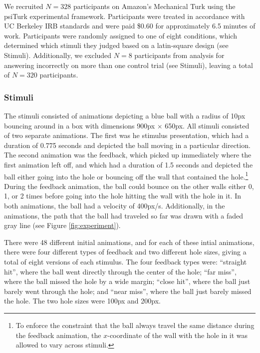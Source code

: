 \documentclass[11pt]{article}
\begin{document}
We recruited $N=328$ participants on Amazon's Mechanical Turk using the psiTurk \cite{McDonnell12} experimental framework. Participants were treated in accordance with UC Berkeley IRB standards and were paid \$0.60 for approximately 6.5 minutes of work. Participants were randomly assigned to one of eight conditions, which determined which stimuli they judged based on a latin-square design (see Stimuli). Additionally, we excluded $N=8$ participants from analysis for answering incorrectly on more than one control trial (see Stimuli), leaving a total of $N=320$ participants.

\subsubsection{Stimuli}

The stimuli consisted of animations depicting a blue ball with a radius of 10px bouncing around in a box with dimensions 900px $\times$ 650px. All stimuli consisted of two separate animations. The first was he stimulus presentation, which had a duration of 0.775 seconds and depicted the ball moving in a particular direction. The second animation was the feedback, which picked up immediately where the first animation left off, and which had a duration of 1.5 seconds and depicted the ball either going into the hole or bouncing off the wall that contained the hole.\footnote{To enforce the constraint that the ball always travel the same distance during the feedback animation, the $x$-coordinate of the wall with the hole in it was allowed to vary across stimuli.} During the feedback animation, the ball could bounce on the other walls either 0, 1, or 2 times before going into the hole hitting the wall with the hole in it. In both animations, the ball had a velocity of 400px/s. Additionally, in the animations, the path that the ball had traveled so far was drawn with a faded gray line (see Figure \ref{fig:experiment}).

There were 48 different initial animations, and for each of these intial animations, there were four different types of feedback and two different hole sizes, giving a total of eight versions of each stimulus. The four feedback types were: ``straight hit'', where the ball went directly through the center of the hole; ``far miss'', where the ball missed the hole by a wide margin; ``close hit'', where the ball just barely went through the hole; and ``near miss'', where the ball just barely missed the hole. The two hole sizes were 100px and 200px.
\end{document}
